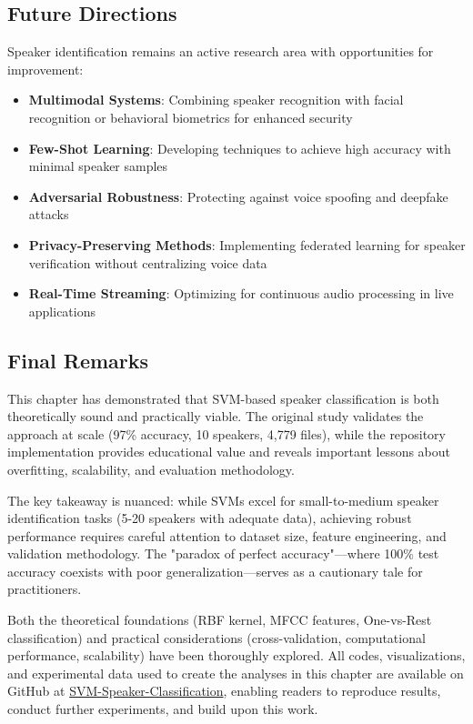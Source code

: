 \documentclass[11pt,twoside,openany]{book}
\begin{document}
\subsection{Future Directions}
Speaker identification remains an active research area with opportunities for improvement:
\begin{itemize}[itemsep=1pt]
\item \textbf{Multimodal Systems}: Combining speaker recognition with facial recognition or behavioral biometrics for enhanced security
\item \textbf{Few-Shot Learning}: Developing techniques to achieve high accuracy with minimal speaker samples
\item \textbf{Adversarial Robustness}: Protecting against voice spoofing and deepfake attacks
\item \textbf{Privacy-Preserving Methods}: Implementing federated learning for speaker verification without centralizing voice data
\item \textbf{Real-Time Streaming}: Optimizing for continuous audio processing in live applications
\end{itemize}

\subsection{Final Remarks}
This chapter has demonstrated that SVM-based speaker classification is both theoretically sound and practically viable. The original study validates the approach at scale (97\% accuracy, 10 speakers, 4,779 files), while the repository implementation provides educational value and reveals important lessons about overfitting, scalability, and evaluation methodology.

The key takeaway is nuanced: while SVMs excel for small-to-medium speaker identification tasks (5-20 speakers with adequate data), achieving robust performance requires careful attention to dataset size, feature engineering, and validation methodology. The "paradox of perfect accuracy"—where 100\% test accuracy coexists with poor generalization—serves as a cautionary tale for practitioners.

Both the theoretical foundations (RBF kernel, MFCC features, One-vs-Rest classification) and practical considerations (cross-validation, computational performance, scalability) have been thoroughly explored. All codes, visualizations, and experimental data used to create the analyses in this chapter are available on GitHub at \href{https://github.com/AVHBAC/SVM_Speaker_Classification}{SVM-Speaker-Classification}, enabling readers to reproduce results, conduct further experiments, and build upon this work.




\end{document}
